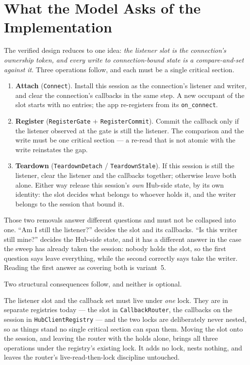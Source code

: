 \documentclass[a4paper,10pt,fleqn]{article}
\begin{document}
\section{What the Model Asks of the Implementation}
\label{sec:consequences}

The verified design reduces to one idea: \emph{the listener slot is the
connection's ownership token, and every write to connection-bound state
is a compare-and-set against it}.  Three operations follow, and each
must be a single critical section.

\begin{enumerate}
  \item \textbf{Attach} (\texttt{Connect}).  Install this session as the
    connection's listener and writer, and clear the connection's
    callbacks in the same step.  A new occupant of the slot starts with
    no entries; the app re-registers from its \texttt{on\_connect}.
  \item \textbf{Register} (\texttt{RegisterGate} $+$
    \texttt{RegisterCommit}).  Commit the callback only if the listener
    observed at the gate is still the listener.  The comparison and the
    write must be one critical section --- a re-read that is not atomic
    with the write reinstates the gap.
  \item \textbf{Teardown} (\texttt{TeardownDetach} /
    \texttt{TeardownStale}).  If this session is still the listener,
    clear the listener and the callbacks together; otherwise leave both
    alone.  Either way release this session's \emph{own} Hub-side state,
    by its own identity: the slot decides what belongs to whoever holds
    it, and the writer belongs to the session that bound it.
\end{enumerate}

Those two removals answer different questions and must not be collapsed
into one.  ``Am I still the listener?'' decides the slot and its
callbacks.  ``Is this writer still mine?'' decides the Hub-side state,
and it has a different answer in the case the sweep has already taken
the session: nobody holds the slot, so the first question says leave
everything, while the second correctly says take the writer.  Reading
the first answer as covering both is variant~5.

Two structural consequences follow, and neither is optional.

The listener slot and the callback set must live under \emph{one} lock.
They are in separate registries today --- the slot in
\texttt{CallbackRouter}, the callbacks on the session in
\texttt{HubClientRegistry} --- and the two locks are deliberately never
nested, so as things stand no single critical section can span them.
Moving the slot onto the session, and leaving the router with the holds
alone, brings all three operations under the registry's existing lock.
It adds no lock, nests nothing, and leaves the router's live-read-then-lock
discipline untouched.
\end{document}
